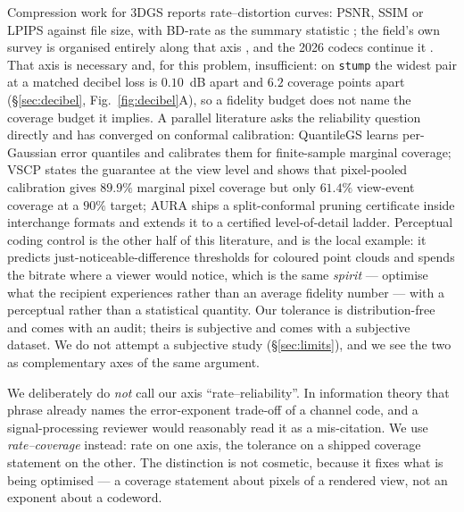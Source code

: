 \documentclass[preprint,number,3p]{elsarticle}
\begin{document}
Compression work for 3DGS reports rate--distortion curves: PSNR, SSIM or LPIPS against file size, with BD-rate as the
summary statistic \cite{hac,pcgs,compgs,contextgs,pup3dgs,zip2025}; the field's own survey is organised entirely along
that axis \cite{zip2025}, and the 2026 codecs continue it \cite{speedygs,rdcompgs,crpgs}. That axis is necessary and,
for this problem, insufficient: on \texttt{stump} the widest pair at a matched decibel loss is $0.10$~dB apart and
$6.2$ coverage points apart (\S\ref{sec:decibel}, Fig.~\ref{fig:decibel}A), so a fidelity budget does not name the
coverage budget it implies. A parallel literature asks the reliability question directly and has converged on
conformal calibration: QuantileGS \cite{quantilegs} learns per-Gaussian error quantiles and calibrates them for
finite-sample marginal coverage; VSCP \cite{vscp} states the guarantee at the view level and shows that pixel-pooled
calibration gives $89.9\%$ marginal pixel coverage but only $61.4\%$ view-event coverage at a $90\%$ target; AURA
\cite{aura} ships a split-conformal pruning certificate inside interchange formats and extends it to a certified
level-of-detail ladder. Perceptual coding control is the other half of this literature, and \cite{jvcir-mjnd} is the
local example: it predicts just-noticeable-difference thresholds for coloured point clouds and spends the bitrate
where a viewer would notice, which is the same \emph{spirit} --- optimise what the recipient experiences rather than
an average fidelity number --- with a perceptual rather than a statistical quantity. Our tolerance is distribution-free
and comes with an audit; theirs is subjective and comes with a subjective dataset. We do not attempt a subjective
study (\S\ref{sec:limits}), and we see the two as complementary axes of the same argument.

We deliberately do \emph{not} call our axis ``rate--reliability''. In information theory that phrase already names the
error-exponent trade-off of a channel code, and a signal-processing reviewer would reasonably read it as a
mis-citation. We use \emph{rate--coverage} instead: rate on one axis, the tolerance on a shipped coverage statement on
the other. The distinction is not cosmetic, because it fixes what is being optimised --- a coverage statement about
pixels of a rendered view, not an exponent about a codeword.
\end{document}
